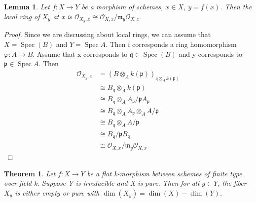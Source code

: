 \documentclass{ctexart}
\newtheorem{theorem}{Theorem}[section]
\newtheorem{lemma}{Lemma}[section]
\newcommand{\spec}{\operatorname{Spec}}
\begin{document}
\begin{lemma}
    Let $f: X \longrightarrow Y$ be a morphism of schemes, $x\in X$, $y = f(x)$.
    Then the local ring of $X_{y}$ at x is $\mathcal{O}_{X_{y}, x} \cong \mathcal{O}_{X, x}/\mathfrak{m}_{y}\mathcal{O}_{X, x}$.
    \label{Lemma 5.4}
\end{lemma}
\begin{proof}
    Since we are discussing about local rings, we can assume that $X = \spec(B)$ and $Y = \spec A$.
    Then f corresponds a ring homomorphism $\varphi: A \longrightarrow B$.
    Assume that x corresponds to $\mathfrak{q}\in \spec(B)$ and y corresponds to $\mathfrak{p}\in \spec A$.
    Then 
    \begin{equation*}
        \begin{split}
            \mathcal{O}_{X_{y}, x} & = (B \otimes_{A} k(\mathfrak{p}))_{\mathfrak{q} \otimes_{A} k(\mathfrak{p})} \\
            & \cong B_{\mathfrak{q}} \otimes_{A} k(\mathfrak{p}) \\
            & \cong B_{\mathfrak{q}} \otimes_{A} A_{\mathfrak{p}}/\mathfrak{p}A_{\mathfrak{p}} \\
            & \cong B_{\mathfrak{q}} \otimes_{A} A_{\mathfrak{p}} \otimes_{A} A/\mathfrak{p} \\
            & \cong B_{\mathfrak{q}} \otimes_{A} A/\mathfrak{p} \\
            & \cong B_{\mathfrak{q}}/\mathfrak{p}B_{\mathfrak{q}} \\
            & \cong \mathcal{O}_{X, x}/\mathfrak{m}_{y}\mathcal{O}_{X, x}
        \end{split}
    \end{equation*}
\end{proof}
\begin{theorem}
    Let $f: X \longrightarrow Y$ be a flat k-morphism between schemes of finite type over field k.
    Suppose Y is irreducible and X is pure.
    Then for all $y\in Y$, the fiber $X_{y}$ is either empty or pure with $\dim(X_{y}) = \dim(X) - \dim(Y)$.
    \label{Theorem 5.9}
\end{theorem}
\end{document}
